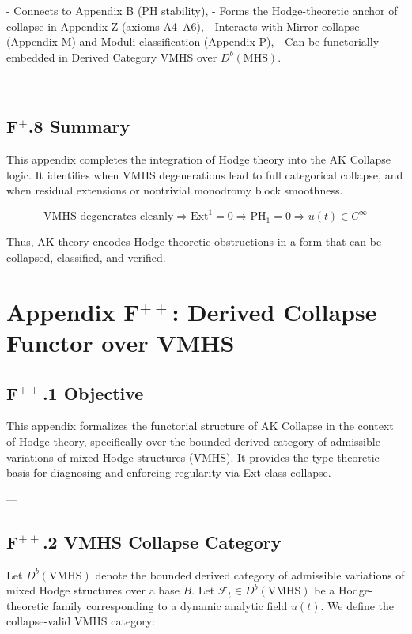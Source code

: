 \documentclass[11pt]{article}
\begin{document}
- Connects to Appendix B (PH stability),
- Forms the Hodge-theoretic anchor of collapse in Appendix Z (axioms A4–A6),
- Interacts with Mirror collapse (Appendix M) and Moduli classification (Appendix P),
- Can be functorially embedded in Derived Category VMHS over \( D^b(\mathrm{MHS}) \).

---

\subsection*{F$^+$.8 Summary}

This appendix completes the integration of Hodge theory into the AK Collapse logic.  
It identifies when VMHS degenerations lead to full categorical collapse, and when residual extensions or nontrivial monodromy  
block smoothness.

\[
\boxed{
\text{VMHS degenerates cleanly} \Rightarrow \mathrm{Ext}^1 = 0 \Rightarrow \mathrm{PH}_1 = 0 \Rightarrow u(t) \in C^\infty
}
\]

Thus, AK theory encodes Hodge-theoretic obstructions in a form that can be collapsed, classified, and verified.


\section*{Appendix F$^{++}$: Derived Collapse Functor over VMHS}

\subsection*{F$^{++}$.1 Objective}

This appendix formalizes the functorial structure of AK Collapse in the context of Hodge theory,  
specifically over the bounded derived category of admissible variations of mixed Hodge structures (VMHS).  
It provides the type-theoretic basis for diagnosing and enforcing regularity via Ext-class collapse.

---

\subsection*{F$^{++}$.2 VMHS Collapse Category}

Let \( D^b(\mathrm{VMHS}) \) denote the bounded derived category of admissible variations of mixed Hodge structures over a base \( B \).  
Let \( \mathcal{F}_t \in D^b(\mathrm{VMHS}) \) be a Hodge-theoretic family corresponding to a dynamic analytic field \( u(t) \).  
We define the collapse-valid VMHS category:
\end{document}
